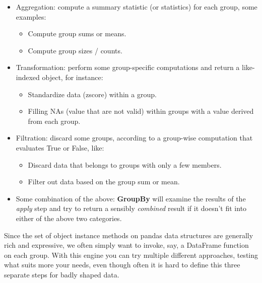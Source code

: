 \begin{itemize}
    \item Aggregation: compute a summary statistic (or statistics) for each group, some examples:
          \begin{itemize}
              \item Compute group sums or means.
              \item Compute group sizes / counts.
          \end{itemize}
    \item Transformation: perform some group-specific computations and return a like-indexed object, for instance:
          \begin{itemize}
              \item Standardize data (zscore) within a group.
              \item Filling NAs (value that are not valid) within groups with a value derived from each group.
          \end{itemize}
    \item Filtration: discard some groups, according to a group-wise computation that evaluates True or False, like:
          \begin{itemize}
              \item Discard data that belongs to groups with only a few members.
              \item Filter out data based on the group sum or mean.
          \end{itemize}
    \item Some combination of the above: \textbf{GroupBy} will examine the results of the \textit{apply} step and try to return a sensibly \textit{combined} result if it doesn't fit into either of the above two categories.
\end{itemize}
Since the set of object instance methods on pandas data structures are generally rich and expressive, we often simply want to invoke, say, a DataFrame function on each group.
With this engine you can try multiple different approaches, testing what suits more your needs, even though often it is hard to define this three separate steps for badly shaped data.

